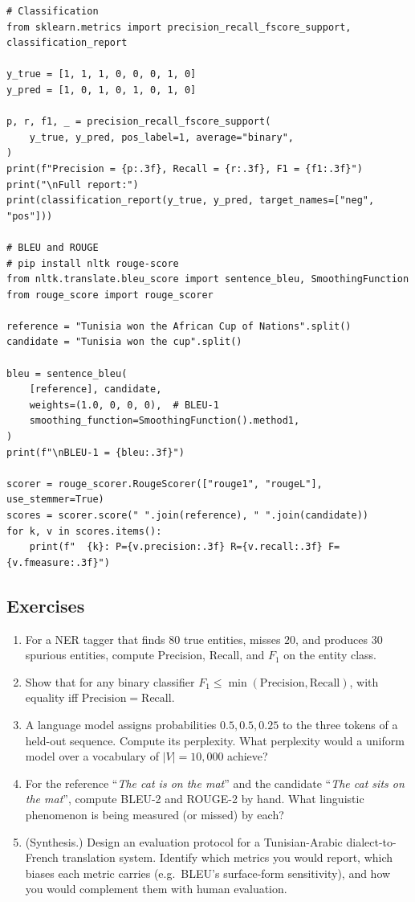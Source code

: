 \begin{lstlisting}
# Classification
from sklearn.metrics import precision_recall_fscore_support, classification_report

y_true = [1, 1, 1, 0, 0, 0, 1, 0]
y_pred = [1, 0, 1, 0, 1, 0, 1, 0]

p, r, f1, _ = precision_recall_fscore_support(
    y_true, y_pred, pos_label=1, average="binary",
)
print(f"Precision = {p:.3f}, Recall = {r:.3f}, F1 = {f1:.3f}")
print("\nFull report:")
print(classification_report(y_true, y_pred, target_names=["neg", "pos"]))

# BLEU and ROUGE
# pip install nltk rouge-score
from nltk.translate.bleu_score import sentence_bleu, SmoothingFunction
from rouge_score import rouge_scorer

reference = "Tunisia won the African Cup of Nations".split()
candidate = "Tunisia won the cup".split()

bleu = sentence_bleu(
    [reference], candidate,
    weights=(1.0, 0, 0, 0),  # BLEU-1
    smoothing_function=SmoothingFunction().method1,
)
print(f"\nBLEU-1 = {bleu:.3f}")

scorer = rouge_scorer.RougeScorer(["rouge1", "rougeL"], use_stemmer=True)
scores = scorer.score(" ".join(reference), " ".join(candidate))
for k, v in scores.items():
    print(f"  {k}: P={v.precision:.3f} R={v.recall:.3f} F={v.fmeasure:.3f}")
\end{lstlisting}

\subsection{Exercises}
\begin{enumerate}
    \item For a NER tagger that finds $80$ true entities, misses $20$, and produces $30$ spurious entities, compute Precision, Recall, and $F_1$ on the entity class.
    \item Show that for any binary classifier $F_1 \le \min(\mathrm{Precision}, \mathrm{Recall})$, with equality iff $\mathrm{Precision} = \mathrm{Recall}$.
    \item A language model assigns probabilities $0.5, 0.5, 0.25$ to the three tokens of a held-out sequence. Compute its perplexity. What perplexity would a uniform model over a vocabulary of $|V| = 10{,}000$ achieve?
    \item For the reference ``\emph{The cat is on the mat}'' and the candidate ``\emph{The cat sits on the mat}'', compute BLEU-2 and ROUGE-2 by hand. What linguistic phenomenon is being measured (or missed) by each?
    \item (Synthesis.) Design an evaluation protocol for a Tunisian-Arabic dialect-to-French translation system. Identify which metrics you would report, which biases each metric carries (e.g.\ BLEU's surface-form sensitivity), and how you would complement them with human evaluation.
\end{enumerate}
